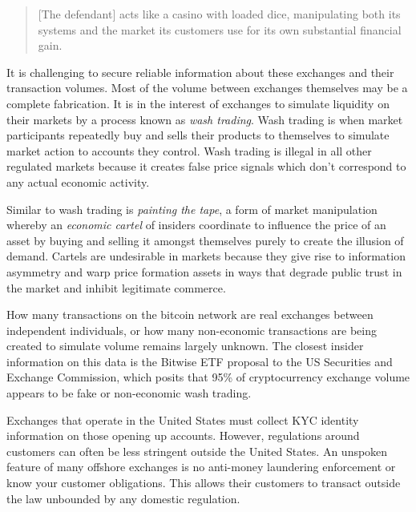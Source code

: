 \begin{quote}
{[}The defendant{]} acts like a casino with loaded dice, manipulating
both its systems and the market its customers use for its own
substantial financial gain.
\end{quote}

It is challenging to secure reliable information about these exchanges and their
transaction volumes. Most of the volume between exchanges themselves may be a
complete fabrication. It is in the interest of exchanges to simulate liquidity
on their markets by a process known as \textit{wash trading}. Wash trading is
when market participants repeatedly buy and sells their products to themselves
to simulate market action to accounts they control. Wash trading is illegal in
all other regulated markets because it creates false price signals which don't
correspond to any actual economic activity.


Similar to wash trading is \textit{painting the tape}, a form of market manipulation
whereby an \textit{economic cartel} of insiders coordinate to influence the price of an
asset by buying and selling it amongst themselves purely to create the illusion
of demand. Cartels are undesirable in markets because they give rise to
information asymmetry and warp price formation assets in ways that degrade
public trust in the market and inhibit legitimate commerce.


How many transactions on the bitcoin network are real exchanges between
independent individuals, or how many non-economic transactions are being created
to simulate volume remains largely unknown. The closest insider information on
this data is the Bitwise ETF proposal to the US Securities and Exchange
Commission, which posits that 95\% of cryptocurrency exchange volume appears to
be fake or non-economic wash trading. \cite{vigna_most_2019, hougan_economic_2019}

Exchanges that operate in the United States must collect KYC identity
information on those opening up accounts. However, regulations around customers
can often be less stringent outside the United States. An unspoken feature of
many offshore exchanges is no anti-money laundering enforcement or know your
customer obligations. This allows their customers to transact outside the law
unbounded by any domestic regulation. \cite{schar_decentralized_2021}

